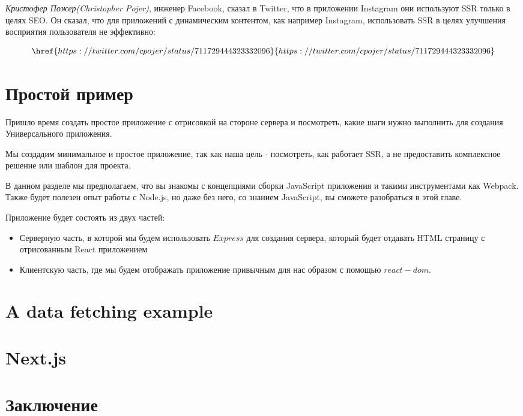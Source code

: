 \textit{Кристофер Пожер(Christopher Pojer)}, инженер Facebook, сказал в Twitter, что в приложении Instagram они используют SSR только в целях SEO. Он сказал, что для приложений с динамическим контентом, как например Instagram, использовать SSR в целях улучшения восприятия пользователя не эффективно:

$$
\href{https://twitter.com/cpojer/status/711729444323332096}{https://twitter.com/cpojer/status/711729444323332096}
$$

\section{Простой пример}

Пришло время создать простое приложение с отрисовкой на стороне сервера и посмотреть, какие шаги нужно выполнить для создания Универсального приложения.

Мы создадим минимальное и простое приложение, так как наша цель - посмотреть, как работает SSR, а не предоставить комплексное решение или шаблон для проекта.

В данном разделе мы предполагаем, что вы знакомы с концепциями сборки JavaScript приложения и такими инструментами как Webpack. Также будет полезен опыт работы с Node.js, но даже без него, со знанием JavaScript, вы сможете разобраться в этой главе.

Приложение будет состоять из двух частей:

\begin{itemize}
	\item Серверную часть, в которой мы будем использовать $Express$ для создания сервера, который будет отдавать HTML страницу с отрисованным React приложением
	\item Клиентскую часть, где мы будем отображать приложение привычным для нас образом с помощью $react-dom$.
\end{itemize}



\section{A data fetching example}

\section{Next.js}

\section{Заключение}








